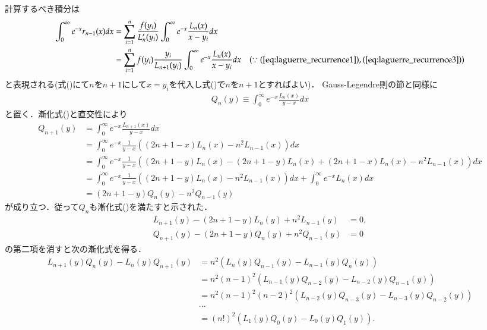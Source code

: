 \documentclass[a4j,papersize,disablejfam,slide,14pt]{jsarticle}
\def\exp#1{e^{#1}} %
\begin{document}
    計算するべき積分は
    \begin{align}
    	\int_{0}^{\infty} \exp{-x}r_{n-1}(x) dx &= \sum_{i=1}^{n} \frac{f(y_i)}{L_n'(y_i)} \int_{0}^{\infty} \exp{-x} \frac{L_n(x)}{x-y_i}dx \\
        &= \sum_{i=1}^{n} f(y_i) \frac{y_i}{L_{n+1}(y_i)} \int_{0}^{\infty} \exp{-x} \frac{L_n(x)}{x-y_i}dx 
        	& (\because (\refeq{eq:laguerre_recurrence1}),(\refeq{eq:laguerre_recurrence3}))
    \end{align}
    と表現される(式()にて$n$を$n+1$にして$x=y_i$を代入し式()で$n$を$n+1$とすればよい)．
    {\rm Gauss-Legendre}則の節と同様に
    \begin{align}
    	Q_n(y) \equiv \int_{0}^{\infty} \exp{-x} \frac{L_n(x)}{y-x} dx
    \end{align}
    と置く．漸化式()と直交性により
    \begin{align}
    	Q_{n+1}(y) &= \int_{0}^{\infty} \exp{-x} \frac{L_{n+1}(x)}{y-x} dx \\
        &= \int_{0}^{\infty} \exp{-x} \frac{1}{y-x} \left( (2n+1-x)L_n(x) - n^2L_{n-1}(x) \right) dx \\
        &= \int_{0}^{\infty} \exp{-x} \frac{1}{y-x} \left( (2n+1-y)L_n(x) - (2n+1-y)L_n(x) + (2n+1-x)L_n(x) - n^2L_{n-1}(x) \right) dx \\
        &= \int_{0}^{\infty} \exp{-x} \frac{1}{y-x} \left( (2n+1-y)L_n(x) - n^2L_{n-1}(x) \right) dx + \int_{0}^{\infty} \exp{-x} L_n(x) dx \\
        &= (2n+1-y)Q_n(y) - n^2Q_{n-1}(y)
    \end{align}
    が成り立つ．従って$Q_n$も漸化式()を満たすと示された．
    \begin{align}
    	L_{n+1}(y) - (2n+1-y)L_n(y) + n^2L_{n-1}(y) &= 0, \\
        Q_{n+1}(y) - (2n+1-y)Q_n(y) + n^2Q_{n-1}(y) &= 0
    \end{align}
    の第二項を消すと次の漸化式を得る．
    \begin{align}
    	L_{n+1}(y) Q_n(y) - L_n(y) Q_{n+1}(y) &= n^2 \left( L_n(y) Q_{n-1}(y) - L_{n-1}(y) Q_n(y) \right) \\
        &= n^2 (n-1)^2 \left( L_{n-1}(y) Q_{n-2}(y) - L_{n-2}(y) Q_{n-1}(y) \right) \\
        &= n^2 (n-1)^2 (n-2)^2 \left( L_{n-2}(y) Q_{n-3}(y) - L_{n-3}(y) Q_{n-2}(y) \right) \\
        &\cdots \\
        &= (n!)^2 \left( L_1(y) Q_0(y) - L_0(y) Q_1(y) \right).
    \end{align}
\end{document}
